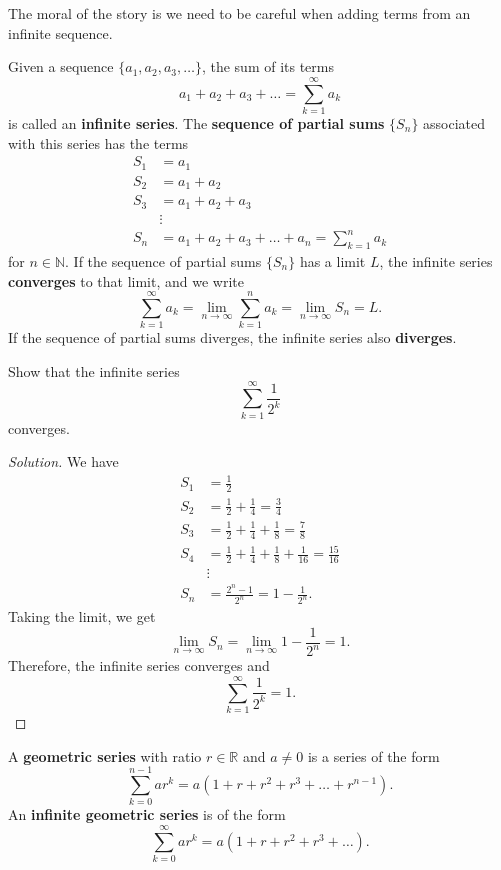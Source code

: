 \documentclass[compacto,10pt,comentarios]{aleph-notas}
\begin{document}
The moral of the story is we need to be careful when adding terms from an infinite sequence.
\begin{defi}
    Given a sequence $\{a_1, a_2, a_3, \ldots \}$, the sum of its terms
    $$
        a_1+a_2+a_3+\ldots = \sum_{k=1}^{\infty} a_k
    $$
    is called an \textbf{infinite series}. The \textbf{sequence of partial sums} $\{S_n\}$ associated with this series has the terms
    \begin{align*}
        S_1 & = a_1 \\
        S_2 & = a_1 + a _2 \\
        S_3 & = a_1 + a_2 + a_3 \\
        & \vdots \\
        S_n & = a_1 + a_2 + a_3 + \ldots + a_n = \sum_{k=1}^{n} a_k
    \end{align*}
    for $n \in \mathbb{N}$. If the sequence of partial sums $\{S_n\}$ has a limit $L$, the infinite series \textbf{converges} to that limit, and we write
    $$
        \sum_{k=1}^{\infty} a_k = \lim_{n \to \infty} \sum_{k=1}^{n} a_k = \lim_{n \to \infty} S_n = L.
    $$
    If the sequence of partial sums diverges, the infinite series also \textbf{diverges}.
\end{defi}
\begin{ejer}
    Show that the infinite series 
    $$
        \sum_{k=1}^\infty \frac{1}{2^k}
    $$ converges.
\end{ejer}
\begin{proof}[Solution]
    We have
    \begin{align*}
        S_1 & = \frac{1}{2} \\
        S_2 & = \frac{1}{2} + \frac{1}{4} = \frac{3}{4} \\
        S_3 & = \frac{1}{2} + \frac{1}{4} + \frac{1}{8}  = \frac{7}{8} \\
        S_4 & = \frac{1}{2} + \frac{1}{4} + \frac{1}{8} + \frac{1}{16} = \frac{15}{16} \\
        & \vdots \\
        S_n & = \frac{2^{n} - 1}{2^{n}} = 1 - \frac{1}{2^{n}}.
    \end{align*}
    Taking the limit, we get
    $$
        \lim_{n \to \infty} S_n = \lim_{n \to \infty} 1 - \frac{1}{2^{n}} = 1.
    $$
    Therefore, the infinite series converges and
    $$
        \sum_{k=1}^\infty \frac{1}{2^k} = 1.
    $$
\end{proof}

\begin{defi}
    A \textbf{geometric series} with ratio $r \in \mathbb{R}$ and $a \neq 0$ is a series of the form
    $$
        \sum_{k=0}^{n-1}ar^k = a (1 + r + r^2 + r^3 + \ldots + r^{n-1}).
    $$
    An \textbf{infinite geometric series} is of the form
    $$
        \sum_{k=0}^{\infty}ar^k = a (1 + r + r^2 + r^3 + \ldots ).
    $$
\end{defi}
\end{document}
